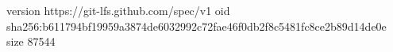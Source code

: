 version https://git-lfs.github.com/spec/v1
oid sha256:b611794bf19959a3874de6032992c72fae46f0db2f8c5481fc8ce2b89d14de0e
size 87544
